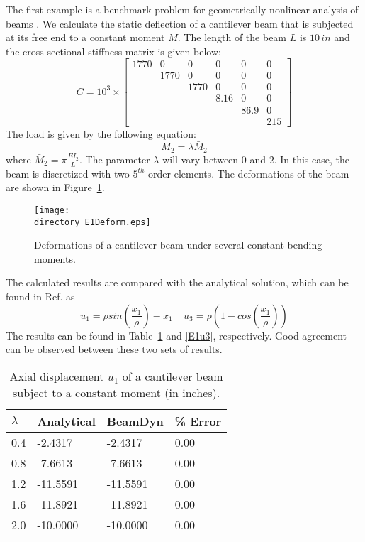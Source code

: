 \documentclass{aiaa-tc}
\def\directory{EPSF/}
\begin{document}
The first example is a benchmark problem for geometrically nonlinear
analysis of beams \cite{Simo1985,Xiao2012}. We calculate the static
deflection of a cantilever beam that is subjected at its free end to
a constant moment $M$.  The length of the beam $L$ is $10\,in$ and the cross-sectional stiffness 
matrix is given below:
\begin{equation}
    \label{StifE1}
    C = 10^3 \times \begin{bmatrix}
	1770 & 0    & 0    & 0    & 0    & 0   \\
	     & 1770 & 0    & 0    & 0    & 0   \\
	     &      & 1770 & 0    & 0    & 0   \\
	     &      &      & 8.16 & 0    & 0   \\
	     &      &      &      & 86.9 & 0   \\
	     &      &      &      &      & 215
\end{bmatrix}
\end{equation} 
The load is given by the following equation:
\begin{equation}
    \label{E1Load}
    M_2 = \lambda \bar{M}_2
\end{equation}
where $\bar{M}_2 = \pi \frac{EI_2}{L}$. The parameter $\lambda$ will vary between $0$ and $2$. In 
this case, the beam is discretized with two $5^{th}$ order elements. The deformations of the beam are shown in Figure~\ref{E1Deform}.
\begin{figure}
    \centering
    \texttt{[image: \\directory E1Deform.eps]}
    \caption{Deformations of a cantilever beam under several constant bending moments.}
    \label{E1Deform}
\end{figure}
The calculated results are compared with the analytical solution, which can be found in Ref.\cite{Mayo:2004} as
\begin{equation}
    \label{E1Analytical}
    u_1 = \rho sin \left( \frac{x_1}{\rho} \right) - x_1~~~~~u_3 = \rho \left(1-cos\left(\frac{x_1}{\rho}\right) \right)
\end{equation}
The results can be found in Table~\ref{E1u1} and \ref{E1u3}, respectively. Good agreement can be observed between these two sets of results.
\begin{table}[tbp]
\centering 
\caption{Axial displacement $u_1$ of a cantilever beam subject to a constant moment (in inches).}
\label{E1u1} 
	\begin{tabular}{| l | l | l | l |}
    	\hline
    	$\lambda$ & Analytical & BeamDyn  & \% Error \\ \hline
    	0.4       & -2.4317    & -2.4317  & 0.00       \\ \hline
    	0.8       & -7.6613    & -7.6613  & 0.00       \\ \hline
    	1.2       & -11.5591   & -11.5591 & 0.00       \\ \hline
    	1.6       & -11.8921   & -11.8921 & 0.00       \\ \hline
    	2.0       & -10.0000   & -10.0000  & 0.00       \\ \hline
    \end{tabular}
\end{table}
\end{document}
